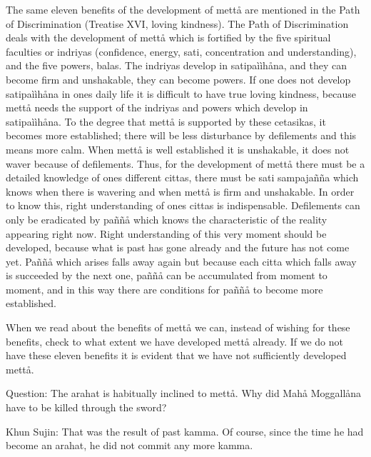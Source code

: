 \documentclass[12pt,twoside]{article}
\begin{document}
The same eleven benefits of the development of mett{\aa} are mentioned
in the Path of Discrimination (Treatise XVI, loving kindness). The Path
of Discrimination deals with the development of mett{\aa} which is
fortified by the five {\textasciigrave}{\textasciigrave}spiritual
faculties{\textquotesingle}{\textquotesingle} or indriyas (confidence,
energy, sati, concentration and understanding), and the five powers,
balas. The indriyas develop in satipa\`i\`ih{\aa}na, and they can
become firm and unshakable, they can become
{\textasciigrave}{\textasciigrave}powers{\textquotesingle}{\textquotesingle}.
If one does not develop satipa\`i\`ih{\aa}na in one{\textquotesingle}s
daily life it is difficult to have true loving kindness, because
mett{\aa} needs the support of the indriyas and powers which develop in
satipa\`i\`ih{\aa}na. To the degree that mett{\aa} is supported by
these cetasikas, it becomes more established; there will be less
disturbance by defilements and this means more calm. When mett{\aa} is
well established it is unshakable, it does not waver because of
defilements. Thus, for the development of mett{\aa} there must be a
detailed knowledge of one{\textquotesingle}s different cittas, there
must be sati sampaja\~n\~na which knows when there is wavering and when
mett{\aa} is firm and unshakable. In order to know this, right
understanding of one{\textquotesingle}s cittas is indispensable.
Defilements can only be eradicated by pa\~n\~n{\aa} which knows the
characteristic of the reality appearing right now. Right understanding
of this very moment should be developed, because what is past has gone
already and the future has not come yet. Pa\~n\~n{\aa} which arises
falls away again but because each citta which falls away is succeeded
by the next one, pa\~n\~n{\aa} can be accumulated from moment to
moment, and in this way there are conditions for pa\~n\~n{\aa} to
become more established. 

When we read about the benefits of mett{\aa} we can, instead of wishing
for these benefits, check to what extent we have developed mett{\aa}
already. If we do not have these eleven benefits it is evident that we
have not sufficiently developed mett{\aa}. 

Question: The arahat is habitually inclined to mett{\aa}. Why did
Mah{\aa} Moggall{\aa}na have to be killed through the sword?

Khun Sujin: That was the result of past kamma. Of course, since the time
he had become an arahat, he did not commit any more kamma. 
\end{document}

